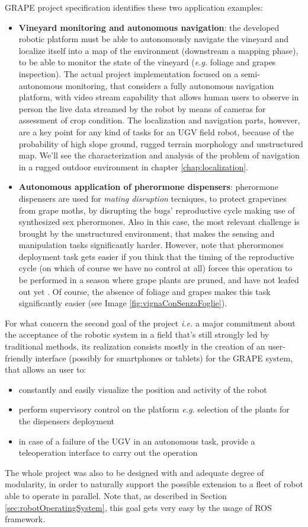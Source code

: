 \ac{GRAPE} project specification identifies these two application examples:
\begin{itemize}
	\item \textbf{Vineyard monitoring and autonomous navigation}: the developed robotic platform must be able to autonomously navigate the vineyard and localize itself into a map of the environment (downstream a mapping phase), to be able to monitor the state of the vineyard (\textit{e.g.} foliage and grapes inspection). The actual project implementation focused on a semi-autonomous monitoring, that considers a fully autonomous navigation platform, with video stream capability that allows human users to observe in person the live data streamed by the robot by means of cameras for assessment of crop condition. The localization and navigation parts, however, are a key point for any kind of tasks for an \ac{UGV} field robot, because of the probability of high slope ground, rugged terrain morphology and unstructured map. We'll see the characterization and analysis of the problem of navigation in a rugged outdoor environment in chapter \ref{chap:localization}.
	\item \textbf{Autonomous application of pherormone dispensers}: pherormone dispensers are used for \textit{mating disruption} tecniques, to protect grapevines from grape moths, by disrupting the bugs' reproductive cycle making use of synthesized sex pherormones. Also in this case, the most relevant challenge is brought by the unstructured environment, that makes the sensing and manipulation tasks significantly harder.  However, note that pherormones deployment task gets easier if you think that the timing of the reproductive cycle (on which of course we have no control at all) forces this operation to be performed in a season where grape plants are pruned, and have not leafed out yet \parencite{mateDisruptionEfficiency}. Of course, the absence of foliage and grapes makes this task significantly easier (see Image \ref{fig:vignaConSenzaFoglie}).
\end{itemize}

For what concern the second goal of the project \textit{i.e.} a major commitment about the acceptance of the robotic system in a field that's still strongly led by traditional methods, its realization consists mostly in the creation of an user-friendly interface (possibly for smartphones or tablets) for the \ac{GRAPE} system, that allows an user to:
\begin{itemize}
	\item constantly and easily visualize the position and activity of the robot 
	\item perform supervisory control on the platform \textit{e.g.} selection of the plants for the dispensers deployment
	\item in case of a failure of the \ac{UGV} in an autonomous task, provide a teleoperation interface to carry out the operation
\end{itemize}
The whole project was also to be designed with and adequate degree of modularity, in order to naturally support the possible extension to a fleet of robot able to operate in parallel. Note that, as described in Section \ref{sec:robotOperatingSystem}, this goal gets very easy by the usage of \ac{ROS} framework.


